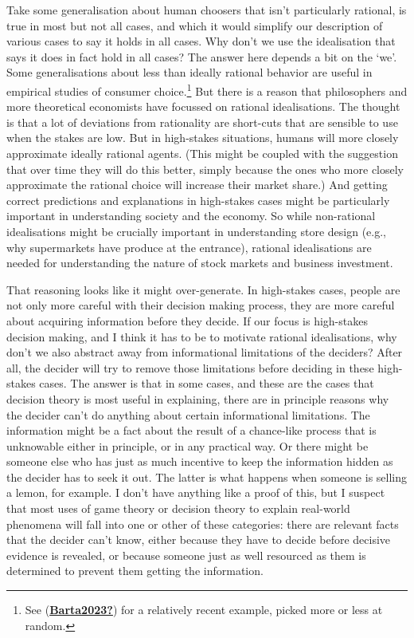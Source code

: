 \documentclass[
  12pt,
  letterpaper,
  DIV=11,
  numbers=noendperiod]{scrreprt}
\begin{document}
Take some generalisation about human choosers that isn't particularly
rational, is true in most but not all cases, and which it would simplify
our description of various cases to say it holds in all cases. Why don't
we use the idealisation that says it does in fact hold in all cases? The
answer here depends a bit on the `we'. Some generalisations about less
than ideally rational behavior are useful in empirical studies of
consumer choice.\footnote{See
  (\protect\hyperlink{ref-Barta2023}{\textbf{Barta2023?}}) for a
  relatively recent example, picked more or less at random.} But there
is a reason that philosophers and more theoretical economists have
focussed on rational idealisations. The thought is that a lot of
deviations from rationality are short-cuts that are sensible to use when
the stakes are low. But in high-stakes situations, humans will more
closely approximate ideally rational agents. (This might be coupled with
the suggestion that over time they will do this better, simply because
the ones who more closely approximate the rational choice will increase
their market share.) And getting correct predictions and explanations in
high-stakes cases might be particularly important in understanding
society and the economy. So while non-rational idealisations might be
crucially important in understanding store design (e.g., why
supermarkets have produce at the entrance), rational idealisations are
needed for understanding the nature of stock markets and business
investment.

That reasoning looks like it might over-generate. In high-stakes cases,
people are not only more careful with their decision making process,
they are more careful about acquiring information before they decide. If
our focus is high-stakes decision making, and I think it has to be to
motivate rational idealisations, why don't we also abstract away from
informational limitations of the deciders? After all, the decider will
try to remove those limitations before deciding in these high-stakes
cases. The answer is that in some cases, and these are the cases that
decision theory is most useful in explaining, there are in principle
reasons why the decider can't do anything about certain informational
limitations. The information might be a fact about the result of a
chance-like process that is unknowable either in principle, or in any
practical way. Or there might be someone else who has just as much
incentive to keep the information hidden as the decider has to seek it
out. The latter is what happens when someone is selling a lemon, for
example. I don't have anything like a proof of this, but I suspect that
most uses of game theory or decision theory to explain real-world
phenomena will fall into one or other of these categories: there are
relevant facts that the decider can't know, either because they have to
decide before decisive evidence is revealed, or because someone just as
well resourced as them is determined to prevent them getting the
information.
\end{document}
